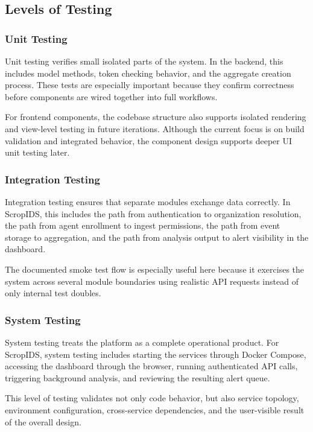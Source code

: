 \documentclass[12pt,a4paper]{article}
\begin{document}
\subsection{Levels of Testing}

\subsubsection{Unit Testing}
Unit testing verifies small isolated parts of the system. In the backend, this includes model methods, token checking behavior, and the aggregate creation process. These tests are especially important because they confirm correctness before components are wired together into full workflows.

For frontend components, the codebase structure also supports isolated rendering and view-level testing in future iterations. Although the current focus is on build validation and integrated behavior, the component design supports deeper UI unit testing later.

\subsubsection{Integration Testing}
Integration testing ensures that separate modules exchange data correctly. In ScropIDS, this includes the path from authentication to organization resolution, the path from agent enrollment to ingest permissions, the path from event storage to aggregation, and the path from analysis output to alert visibility in the dashboard.

The documented smoke test flow is especially useful here because it exercises the system across several module boundaries using realistic API requests instead of only internal test doubles.

\subsubsection{System Testing}
System testing treats the platform as a complete operational product. For ScropIDS, system testing includes starting the services through Docker Compose, accessing the dashboard through the browser, running authenticated API calls, triggering background analysis, and reviewing the resulting alert queue.

This level of testing validates not only code behavior, but also service topology, environment configuration, cross-service dependencies, and the user-visible result of the overall design.
\end{document}
